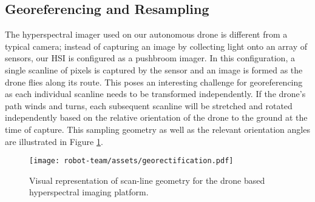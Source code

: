 \subsection{Georeferencing and Resampling}

The hyperspectral imager used on our autonomous drone is different from a typical camera; instead of capturing an image by collecting light onto an array of sensors, our HSI is configured as a pushbroom imager. In this configuration, a single scanline of pixels is captured by the sensor and an image is formed as the drone flies along its route. This poses an interesting challenge for georeferencing as each individual scanline needs to be transformed independently. If the drone's path winds and turns, each subsequent scanline will be stretched and rotated independently based on the relative orientation of the drone to the ground at the time of capture. This sampling geometry as well as the relevant orientation angles are illustrated in Figure \ref{fig:georectification}.

\begin{figure}[h]
  \centering
  \texttt{[image: robot-team/assets/georectification.pdf]}
  \caption{Visual representation of scan-line geometry for the drone based hyperspectral imaging platform.}
  \label{fig:georectification}
\end{figure}

